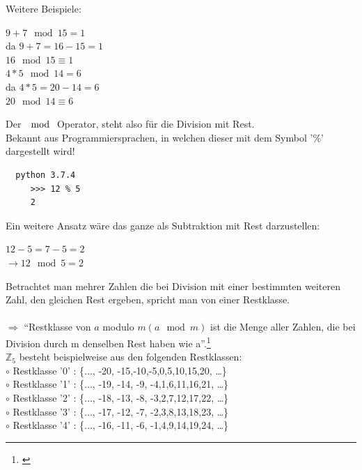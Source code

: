 \documentclass[a4paper,12pt]{scrartcl}
\begin{document}
 Weitere Beispiele:

 \begin{center}
  $9 + 7 \mod 15 = 1$\\
  da $9 + 7 = 16 - 15 = 1$\\
  $16 \mod 15 \equiv 1$\\[0.3in]
  
  
  $4 * 5 \mod 14 = 6$\\
  da $4 * 5 = 20 - 14 = 6$\\
  $20 \mod 14 \equiv 6$

 \end{center}
 
 Der $\mod$ Operator, steht also für die Division mit Rest.\\ Bekannt aus Programmiersprachen, in welchen dieser mit dem Symbol '$\%$' dargestellt wird!
 
 \begin{center}
 \begin{verbatim}
  python 3.7.4
     >>> 12 % 5
     2
 \end{verbatim}

 \end{center}
\newpage
 Ein weitere Ansatz wäre das ganze als Subtraktion mit Rest darzustellen:
 
 \begin{center}
  $12 - 5 = 7 -5 = 2$\\
  $\rightarrow 12 \mod 5 = 2$
 \end{center}
 
 
 Betrachtet man mehrer Zahlen die bei Division mit einer bestimmten weiteren Zahl, den gleichen Rest ergeben, spricht man von einer Restklasse.\\\\
 $\Rightarrow$ ``Restklasse von $a$ modulo $m (a \mod m)$ ist die Menge aller Zahlen, die bei\\ Division durch m denselben Rest haben wie a''.\footnote{\cite{Wätjen2018}}\\
 \newline
 $\mathbb{Z}_{5}$ besteht beispielweise aus den folgenden Restklassen:
 \newline
 \\
 $\circ$ Restklasse '0' : \{$\dots$, -20, -15,-10,-5,0,5,10,15,20, \dots\}\\
 $\circ$ Restklasse '1' : \{$\dots$, -19, -14, -9, -4,1,6,11,16,21, \dots \}\\
 $\circ$ Restklasse '2' : \{$\dots$, -18, -13, -8, -3,2,7,12,17,22, \dots \}\\
 $\circ$ Restklasse '3' : \{$\dots$, -17, -12, -7, -2,3,8,13,18,23, \dots \}\\
 $\circ$ Restklasse '4' : \{$\dots$, -16, -11, -6, -1,4,9,14,19,24, \dots \}
 \newline
\end{document}
